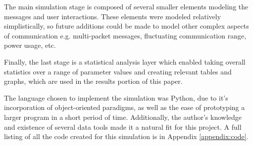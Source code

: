 The main simulation stage is composed of several smaller elements modeling
the messages and user interactions.
These elements were modeled relatively simplistically, so future additions could be
made to model other complex aspects of communication e.g. multi-packet messages,
fluctuating communication range, power usage, etc.

Finally, the last stage is a statistical analysis layer which enabled taking overall
statistics over a range of parameter values and creating relevant tables and graphs,
which are used in the results portion of this paper.

The language chosen to implement the simulation was Python, due to it's incorporation of 
object-oriented paradigms, as well as the ease of prototyping a larger program in a 
short period of time.
Additionally, the author's knowledge and existence of several data tools made it a natural
fit for this project.
A full listing of all the code created for this simulation is in Appendix \ref{appendix:code}.
